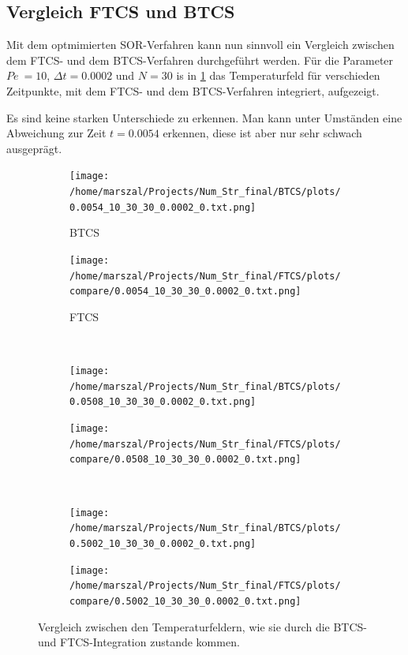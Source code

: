 \subsection{Vergleich FTCS und BTCS}
Mit dem optmimierten SOR-Verfahren kann nun sinnvoll ein Vergleich zwischen dem FTCS- und dem BTCS-Verfahren durchgeführt werden.
Für die Parameter $Pe~=10$, $\Delta t=0.0002$ und $N=30$ is in \cref{fig:vergleich} das Temperaturfeld für verschieden Zeitpunkte, mit dem FTCS- und dem BTCS-Verfahren integriert, aufgezeigt.

Es sind keine starken Unterschiede zu erkennen. Man kann unter Umständen eine Abweichung zur Zeit $t=0.0054$ erkennen, diese ist aber nur sehr schwach ausgeprägt.

\begin{figure}
  \centering
  \begin{subfigure}[b]{0.5\textwidth}\caption{BTCS}
  \texttt{[image: /home/marszal/Projects/Num\_Str\_final/BTCS/plots/0.0054\_10\_30\_30\_0.0002\_0.txt.png]}
  \end{subfigure}
  \hspace{-0.5cm}
  \begin{subfigure}[b]{0.5\textwidth}\caption{FTCS}
  \texttt{[image: /home/marszal/Projects/Num\_Str\_final/FTCS/plots/compare/0.0054\_10\_30\_30\_0.0002\_0.txt.png]}
  \end{subfigure}
  \\
  \begin{subfigure}[b]{0.5\textwidth}
  \texttt{[image: /home/marszal/Projects/Num\_Str\_final/BTCS/plots/0.0508\_10\_30\_30\_0.0002\_0.txt.png]}
  \end{subfigure}
  \hspace{-0.5cm}
  \begin{subfigure}[b]{0.5\textwidth}
  \texttt{[image: /home/marszal/Projects/Num\_Str\_final/FTCS/plots/compare/0.0508\_10\_30\_30\_0.0002\_0.txt.png]}
  \end{subfigure}
  \\
  \begin{subfigure}[b]{0.5\textwidth}
  \texttt{[image: /home/marszal/Projects/Num\_Str\_final/BTCS/plots/0.5002\_10\_30\_30\_0.0002\_0.txt.png]}
  \end{subfigure}
  \hspace{-0.5cm}
  \begin{subfigure}[b]{0.5\textwidth}
  \texttt{[image: /home/marszal/Projects/Num\_Str\_final/FTCS/plots/compare/0.5002\_10\_30\_30\_0.0002\_0.txt.png]}
  \end{subfigure}
  \caption{Vergleich zwischen den Temperaturfeldern, wie sie durch die BTCS- und FTCS-Integration zustande kommen.}\label{fig:vergleich}
\end{figure}

